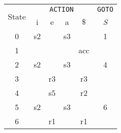 \documentclass[border=0.8ex,varwidth]{standalone}
\begin{document}
\begin{table}
  \begin{tabular}{cccccc}
    \toprule
    \multirow{2}{*}{State} & \multicolumn{4}{c}{\texttt{ACTION}} &
                                                                  \texttt{GOTO}\\
    \cline{2-6}
                          & i & e & a & \(\$\) & \textit{S}\\
    \midrule
    0 & s2  &     & s3  &     & 1\\
    1 &     &     &     & acc &  \\
    2 & s2  &     & s3  &     & 4\\
    3 &     & r3  &     & r3  &  \\
    4 &     & s5  &     & r2  &  \\
    5 & s2  &     & s3  &     & 6\\
    6 &     & r1  &     & r1  &  \\
    \bottomrule
  \end{tabular}
\end{table}
\end{document}
